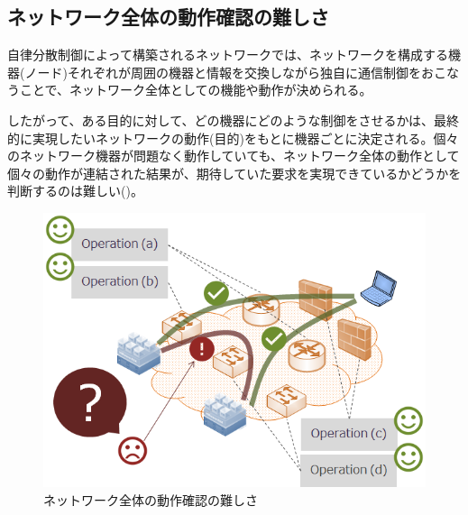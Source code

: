   \subsection{ネットワーク全体の動作確認の難しさ}

自律分散制御によって構築されるネットワークでは、ネットワークを構成する機
器(ノード)それぞれが周囲の機器と情報を交換しながら独自に通信制御をおこな
うことで、ネットワーク全体としての機能や動作が決められる。

したがって、ある目的に対して、どの機器にどのような制御をさせるかは、最終
的に実現したいネットワークの動作(目的)をもとに機器ごとに決定される。個々
のネットワーク機器が問題なく動作していても、ネットワーク全体の動作として
個々の動作が連結された結果が、期待していた要求を実現できているかどうかを
判断するのは難しい()。

 \begin{figure}[h]
  \centering
  \includegraphics[scale=0.5]{img/difficulty-of-network-operation.png}
  \caption{ネットワーク全体の動作確認の難しさ}
  \label{fig:difficulty-of-network-operation}
 \end{figure}

